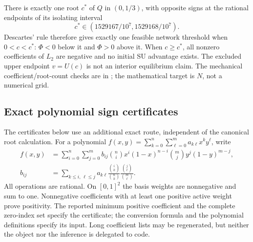 There is exactly one root $c^*$ of $Q$ in $(0,1/3)$, with opposite signs
at the rational endpoints of its isolating interval
\[
c^*\in(1529167/10^7,1529168/10^7).
\]
Descartes' rule therefore gives exactly one feasible network threshold when
$0<c<c^*$: $\Phi<0$ below it and $\Phi>0$ above it. When
$c\ge c^*$, all nonzero coefficients of $L_2$ are negative and no
initial SU advantage exists. The excluded upper endpoint $v=U(c)$ is not an
interior equilibrium claim. The mechanical coefficient/root-count checks are
in ; the mathematical target is
$N$, not a numerical grid.

\subsection{Exact polynomial sign certificates}
The certificates below use an additional exact route, independent of the
canonical root calculation. For a polynomial
$f(x,y)=\sum_{k=0}^{n}\sum_{\ell=0}^{m}a_{k\ell}x^ky^\ell$, write
\begin{align*}
f(x,y)&=\sum_{i=0}^{n}\sum_{j=0}^{m}
 b_{ij}\binom ni x^i(1-x)^{n-i}\binom mj y^j(1-y)^{m-j},\\
b_{ij}&=\sum_{k\le i,\,\ell\le j}a_{k\ell}
 \frac{\binom ik}{\binom nk}\frac{\binom j\ell}{\binom m\ell}.
\end{align*}
All operations are rational. On $[0,1]^2$ the basis weights are nonnegative
and sum to one. Nonnegative coefficients with at least one positive active
weight prove positivity. The reported minimum positive coefficient and the
complete zero-index set specify the certificate; the conversion formula and
the polynomial definitions specify its input. Long coefficient lists may be
regenerated, but neither the object nor the inference is delegated to code.

